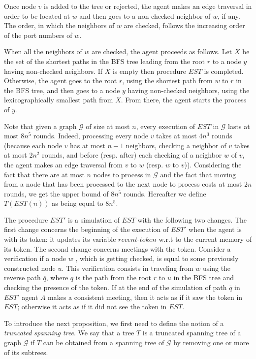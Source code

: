 \documentclass[11pt]{article}
\begin{document}
{Once node $v$ is added to the tree or rejected, the agent makes an edge traversal in order to be located at $w$ and then goes to a non-checked neighbor of $w$, if any. The order, in which the neighbors of $w$ are checked, follows the increasing order of the port numbers of $w$.} 

{When all the neighbors of $w$ are checked, the agent proceeds as follows. Let $X$ be the set of the shortest paths in the BFS tree leading from the root $r$ to a node $y$ having non-checked neighbors. If $X$ is empty then procedure $EST$ is completed. Otherwise, the agent goes to the root $r$, using the shortest path from $w$ to $r$ in the BFS tree, and then goes to a node $y$ having non-checked neighbors, using the lexicographically smallest path from $X$. From there, the agent starts the process of $y$.}

{Note that given a graph $\mathcal{G}$ of size at most $n$, every execution of $EST$ in $\mathcal{G}$ lasts at most $8n^5$ rounds. Indeed,  processing every node $v$ takes at most $4n^3$ rounds (because each node $v$ has at most $n-1$ neighbors, checking a neighbor of $v$ takes at most $2n^2$ rounds, and before (resp. after) each checking of a neighbor $w$ of $v$, the agent makes an edge traversal from $v$ to $w$ (resp. $w$ to $v$)). Considering the fact that there are at most $n$ nodes to process in $\mathcal{G}$ and the fact that moving from a node that has been processed to the next node to process costs at most $2n$ rounds, we get the upper bound of $8n^5$ rounds. Hereafter we define $T(EST(n))$ as being equal to $8n^5$.}

{The procedure $EST'$ is a simulation of $EST$ with the following two changes. The first change concerns the beginning of the execution of $EST'$ when the agent is with its token: it updates its variable $recent$-$token$ w.r.t to the current memory of its token. The second change concerns meetings with the token. Consider a verification if a node $w$ , which is getting checked, is equal to some previously constructed node $u$. This verification consists in traveling from $w$ using the reverse path $\overline{q}$,  where $q$ is the path from the root $r$ to $u$ in the BFS tree and checking the presence of the token. If 
 at the end of the simulation of path $\overline{q}$ in $EST'$ agent $A$ makes a consistent meeting, then it acts as if it saw the token in $EST$; otherwise it acts as if it did not see
 the token in $EST$.}

{To introduce the next proposition, we first need to define the notion of a {\em truncated spanning tree}. We say that a tree $T$ is a truncated spanning tree of a graph $\mathcal{G}$ if $T$ can be obtained from a spanning tree of $\mathcal{G}$ by removing one or more of its subtrees.}
\end{document}
